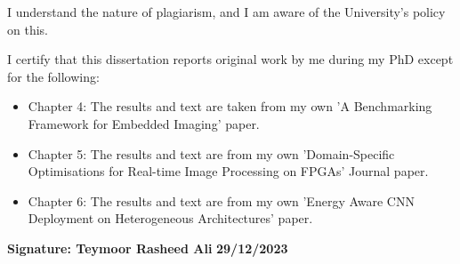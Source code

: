 
I understand the nature of plagiarism, and I am aware of the University's 
policy on this.

I certify that this dissertation reports original work by me during my 
PhD except for the following:
\begin{itemize}
    \item Chapter 4: The results and text are taken from my own 'A Benchmarking Framework for Embedded Imaging' paper.
    \item Chapter 5: The results and text are from my own 'Domain-Specific Optimisations for Real-time Image Processing on FPGAs' Journal paper.
    \item Chapter 6: The results and text are from my own 'Energy Aware CNN Deployment on Heterogeneous
Architectures' paper.
\end{itemize}


\textbf{Signature: Teymoor Rasheed Ali} %
\textit{} %
 \textbf{29/12/2023}

